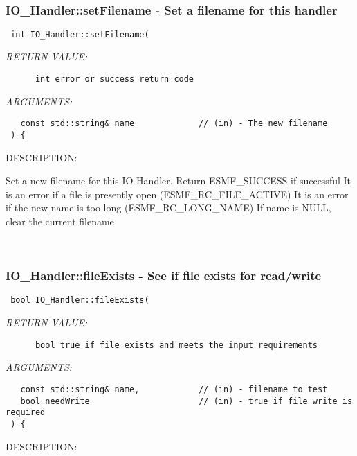 
\mbox{}\hrulefill\
 
\subsubsection [IO\_Handler::setFilename] {IO\_Handler::setFilename - Set a filename for this handler}


  
\begin{verbatim} int IO_Handler::setFilename(\end{verbatim}{\em RETURN VALUE:}
\begin{verbatim}      int error or success return code\end{verbatim}{\em ARGUMENTS:}
\begin{verbatim}   const std::string& name             // (in) - The new filename
 ) {\end{verbatim}
{\sf DESCRIPTION:\\ }


        Set a new filename for this IO Handler.
        Return ESMF_SUCCESS if successful
        It is an error if a file is presently open (ESMF_RC_FILE_ACTIVE)
        It is an error if the new name is too long (ESMF_RC_LONG_NAME)
        If name is NULL, clear the current filename
   
 
\mbox{}\hrulefill\
 
\subsubsection [IO\_Handler::fileExists] {IO\_Handler::fileExists - See if file exists for read/write}


  
\begin{verbatim} bool IO_Handler::fileExists(\end{verbatim}{\em RETURN VALUE:}
\begin{verbatim}      bool true if file exists and meets the input requirements\end{verbatim}{\em ARGUMENTS:}
\begin{verbatim}   const std::string& name,            // (in) - filename to test
   bool needWrite                      // (in) - true if file write is required
 ) {\end{verbatim}
{\sf DESCRIPTION:\\ }


